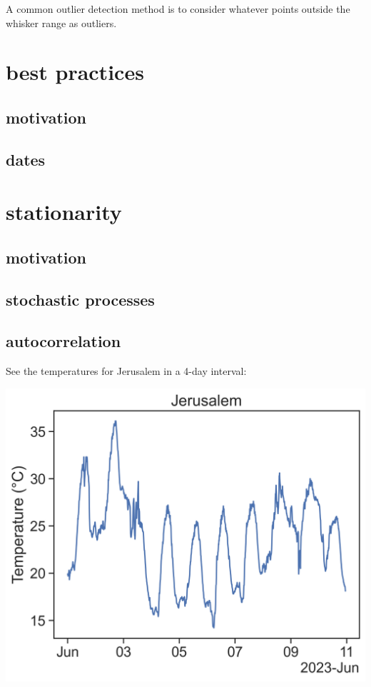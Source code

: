 \documentclass[
  letterpaper,
  DIV=11,
  numbers=noendperiod,
  oneside]{scrreprt}
\begin{document}
A common outlier detection method is to consider whatever points outside
the whisker range as outliers.

\part{best practices}

\hypertarget{motivation-3}{%
\chapter{motivation}\label{motivation-3}}

\hypertarget{dates}{%
\chapter{dates}\label{dates}}

\part{stationarity}

\hypertarget{motivation-4}{%
\chapter{motivation}\label{motivation-4}}

\hypertarget{stochastic-processes}{%
\chapter{stochastic processes}\label{stochastic-processes}}

\hypertarget{autocorrelation}{%
\chapter{autocorrelation}\label{autocorrelation}}

See the temperatures for Jerusalem in a 4-day interval:

\includegraphics{stationarity/jer_temp1.png}
\end{document}
